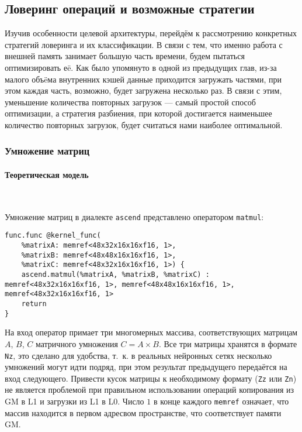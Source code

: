 \subsection{Ловеринг операций и возможные стратегии}
\label{impl:lowering} %

\newcommand{\divisible}{\mathop{\raisebox{-2pt}{\vdots}}}

Изучив особенности целевой архитектуры, перейдём к рассмотрению
конкретных стратегий ловеринга и их классификации. В связи с тем, что именно
работа с внешней память занимает большую часть времени, будем пытаться
оптимизировать еë. Как было упомянуто в одной из предыдущих глав, из-за малого
объëма внутренних кэшей данные приходится загружать частями, при этом каждая часть,
возможно, будет загружена несколько раз. В связи с этим, уменьшение количества
повторных загрузок --- самый простой способ оптимизации, а стратегия разбиения,
при которой достигается наименьшее количество повторных загрузок, будет считаться
нами наиболее оптимальной.

\subsubsection{Умножение матриц}

\paragraph{Теоретическая модель}~

Умножение матриц в диалекте \texttt{ascend} представлено оператором \texttt{matmul}:

\begin{lstlisting}
func.func @kernel_func(
    %matrixA: memref<48x32x16x16xf16, 1>,
    %matrixB: memref<48x48x16x16xf16, 1>,
    %matrixC: memref<48x32x16x16xf16, 1>) {
    ascend.matmul(%matrixA, %matrixB, %matrixC) : memref<48x32x16x16xf16, 1>, memref<48x48x16x16xf16, 1>, memref<48x32x16x16xf16, 1>
    return
}
\end{lstlisting}

На вход оператор примает три многомерных массива, соответствующих матрицам
$A$, $B$, $C$ матричного умножения $C = A \times B$. Все три матрицы хранятся
в формате \texttt{Nz}, это сделано для удобства, т.~к. в реальных нейронных сетях
несколько умножений могут идти подряд, при этом результат предыдущего
передаётся на вход следующего. Привести кусок матрицы к необходимому формату
(\texttt{Zz} или \texttt{Zn}) не является проблемой при правильном использовании
операций копирования из GM в L1 и загрузки из L1 в L0. Число $1$ в конце каждого
\texttt{memref} означает, что массив находится в первом адресвом пространстве, что
соответствует памяти GM.

